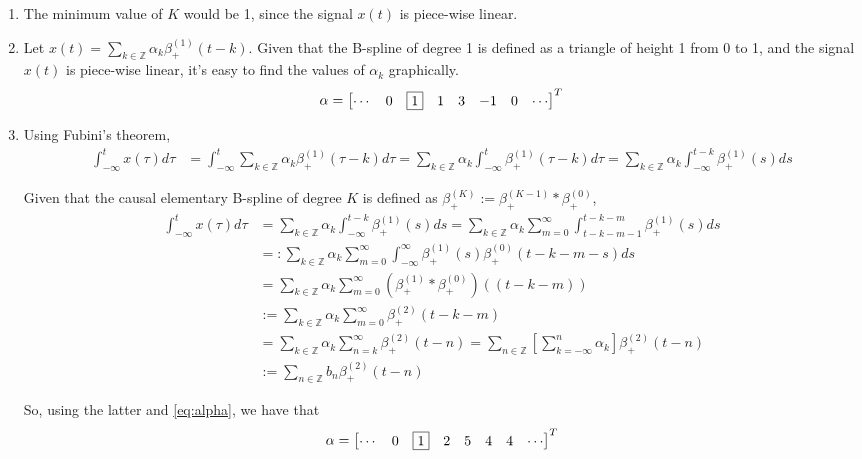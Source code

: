 \documentclass{article}
\begin{document}
    \begin{enumerate}
        \item The minimum value of $K$ would be 1, since the signal $x(t)$ is piece-wise linear.
        \item Let $x(t)=\sum_{k \in \mathbb{Z}}\alpha_k \beta_+^{(1)}(t-k)$. Given that the B-spline of degree 1 is defined as a triangle of height 1 from 0 to 1, and the signal $x(t)$ is piece-wise linear, it's easy to find the values of $\alpha_k$ graphically.
        \begin{align}
            \alpha = \begin{bmatrix}
                \cdots &
                0 &
                \fbox{1} &
                1 &
                3 &
                -1 &
                0 &
                \cdots
            \end{bmatrix}^T
            \label{eq:alpha}
        \end{align}
        \item Using Fubini's theorem,
        \begin{align}
            \int_{-\infty}^t x(\tau) d\tau &= \int_{-\infty}^t\sum_{k \in \mathbb{Z}}\alpha_k \beta_+^{(1)}(\tau-k) d\tau=\sum_{k \in \mathbb{Z}}\alpha_k \int_{-\infty}^t \beta_+^{(1)}(\tau-k) d\tau =\sum_{k \in \mathbb{Z}}\alpha_k \int_{-\infty}^{t-k} \beta_+^{(1)}(s) ds 
        \end{align}
        
        Given that the causal elementary B-spline of degree $K$ is defined as $\beta_+^{(K)}:=\beta_+^{(K-1)} \ast \beta_+^{(0)}$,
        \begin{align}
        \int_{-\infty}^t x(\tau) d\tau  &= \sum_{k \in \mathbb{Z}}\alpha_k \int_{-\infty}^{t-k} \beta_+^{(1)}(s) ds= \sum_{k \in \mathbb{Z}}\alpha_k \sum_{m=0}^{\infty}\int_{t-k-m-1}^{t-k-m} \beta_+^{(1)}(s) ds \\
        &=: \sum_{k \in \mathbb{Z}}\alpha_k\sum_{m=0}^{\infty}\int_{-\infty}^{\infty} \beta_+^{(1)}(s) \beta_+^{(0)}(t-k-m-s) ds \\
        &= \sum_{k \in \mathbb{Z}}\alpha_k\sum_{m=0}^{\infty} (\beta_+^{(1)} \ast  \beta_+^{(0)})((t-k-m)) 
        \\&:= \sum_{k \in \mathbb{Z}}\alpha_k\sum_{m=0}^{\infty} \beta_+^{(2)}(t-k-m) \\
        &=\sum_{k \in \mathbb{Z}}\alpha_k \sum_{n=k}^{\infty} \beta_+^{(2)}(t-n)=\sum_{n \in \mathbb{Z}} \left[\sum_{k=-\infty}^{n}\alpha_k \right] \beta_+^{(2)}(t-n) \\
        &:= \sum_{n \in \mathbb{Z}} b_n \beta_+^{(2)}(t-n)
        \end{align}
        
        So, using the latter and \eqref{eq:alpha}, we have that
        \begin{align}
            \alpha = \begin{bmatrix}
                \cdots &
                0 &
                \fbox{1} &
                2 &
                5 &
                4 &
                4 &
                \cdots
            \end{bmatrix}^T
        \end{align}
        
    \end{enumerate}
\end{document}
